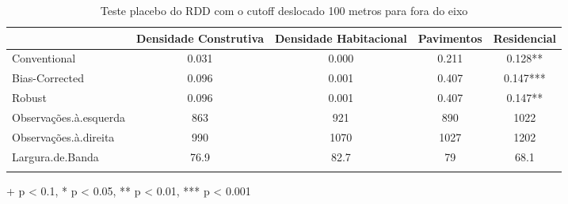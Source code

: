 \begin{table}[!t]
\caption{Teste placebo do RDD com o cutoff deslocado 100 metros para fora do eixo} 
\fontsize{10pt}{12pt}\selectfont
\begin{tabular*}{\linewidth}{@{\extracolsep{\fill}}lcccc}
\toprule
  & Densidade Construtiva & Densidade Habitacional & Pavimentos & Residencial \\ 
\midrule\addlinespace[2.5pt]
Conventional & 0.031 & 0.000 & 0.211 & 0.128** \\ 
Bias-Corrected & 0.096 & 0.001 & 0.407 & 0.147*** \\ 
{Robust} & {0.096} & {0.001} & {0.407} & {0.147**} \\ 
\midrule
Observações.à.esquerda & 863 & 921 & 890 & 1022 \\ 
Observações.à.direita & 990 & 1070 & 1027 & 1202 \\ 
Largura.de.Banda & 76.9 & 82.7 & 79 & 68.1 \\ 
\bottomrule
\label{tab:rdd-IPTU-placebo}
\end{tabular*}
\begin{minipage}{\linewidth}
+ p < 0.1, * p < 0.05, ** p < 0.01, *** p < 0.001\\
\end{minipage}
\end{table}

